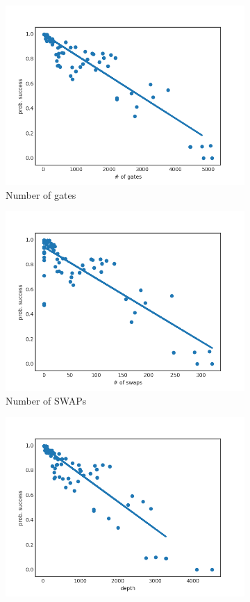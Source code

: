 \documentclass[11pt]{article}
\begin{document}
\begin{figure}[H] 
  \begin{subfigure}[b]{0.5\linewidth}
    \centering
    \includegraphics[width=0.75\linewidth]{ps_g_3000_0_005} 
    \caption{Number of gates} 
    \label{fig:ps_g_3000} 
    \vspace{4ex}
  \end{subfigure}%
  \begin{subfigure}[b]{0.5\linewidth}
    \centering
    \includegraphics[width=0.75\linewidth]{ps_s_3000_0_005} 
    \caption{Number of SWAPs} 
    \label{fig:ps_s_3000} 
    \vspace{4ex}
  \end{subfigure} 
  \begin{subfigure}[b]{0.5\linewidth}
    \centering
    \includegraphics[width=0.75\linewidth]{ps_d_3000_0_005} 

\end{subfigure}
\end{figure}
\end{document}
